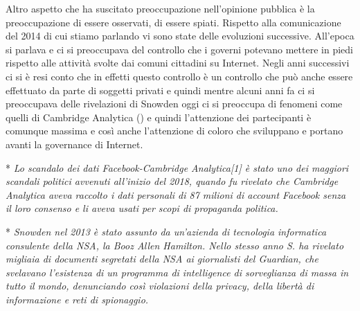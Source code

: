 Altro aspetto che ha suscitato preoccupazione nell'opinione pubblica è la preoccupazione di essere osservati, di essere spiati. Rispetto alla comunicazione del 2014 di cui stiamo parlando vi sono state delle evoluzioni successive. All'epoca si parlava e ci si preoccupava del controllo che i governi potevano mettere in piedi rispetto alle attività svolte dai comuni cittadini su Internet. Negli anni successivi ci si è resi conto che in effetti questo controllo è un controllo che può anche essere effettuato da parte di soggetti privati e quindi mentre alcuni anni fa ci si preoccupava delle rivelazioni di Snowden oggi ci si preoccupa di fenomeni come quelli di Cambridge Analytica () e quindi l'attenzione dei partecipanti è comunque massima e così anche l'attenzione di coloro che sviluppano e portano avanti la governance di Internet. \par

*\textit{ Lo scandalo dei dati Facebook-Cambridge Analytica[1] è stato uno dei maggiori scandali politici avvenuti all'inizio del 2018, quando fu rivelato che Cambridge Analytica aveva raccolto i dati personali di 87 milioni di account Facebook senza il loro consenso e li aveva usati per scopi di propaganda politica.}\par


* \textit{Snowden nel 2013 è stato assunto da un'azienda di tecnologia informatica consulente della NSA, la Booz Allen Hamilton. Nello stesso anno S. ha rivelato migliaia di documenti segretati della NSA ai giornalisti del Guardian, che svelavano l’esistenza di un programma di intelligence di sorveglianza di massa in tutto il mondo, denunciando così violazioni della privacy, della libertà di informazione e reti di spionaggio.}

